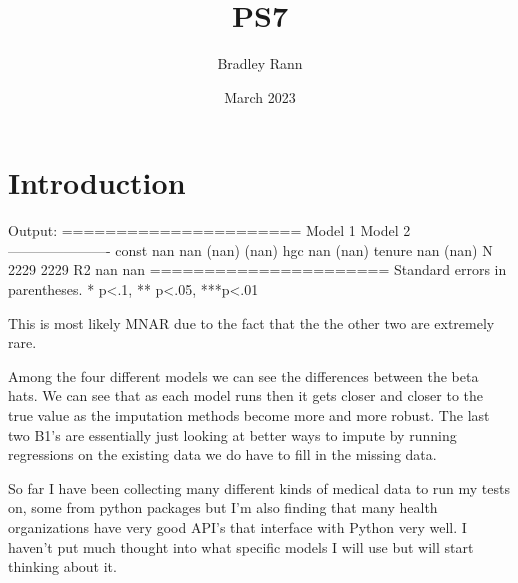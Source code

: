 \documentclass{article}
\title{PS7}
\author{Bradley Rann }
\date{March 2023}
\begin{document}
\maketitle

\section{Introduction}

Output: ======================
       Model 1 Model 2
----------------------
const  nan     nan    
       (nan)   (nan)  
hgc    nan            
       (nan)          
tenure         nan    
               (nan)  
N      2229    2229   
R2     nan     nan    
======================
Standard errors in
parentheses.
* p<.1, ** p<.05,
***p<.01

This is most likely MNAR due to the fact that the the other two are extremely rare.

Among the four different models we can see the differences between the beta hats. We can see that as each model runs then it gets closer and closer to the true value as the imputation methods become more and more robust. The last two B1's are essentially just looking at better ways to impute by running regressions on the existing data we do have to fill in the missing data.

So far I have been collecting many different kinds of medical data to run my tests on, some from python packages but I'm also finding that many health organizations have very good API's that interface with Python very well. I haven't put much thought into what specific models I will use but will start thinking about it.
\end{document}
